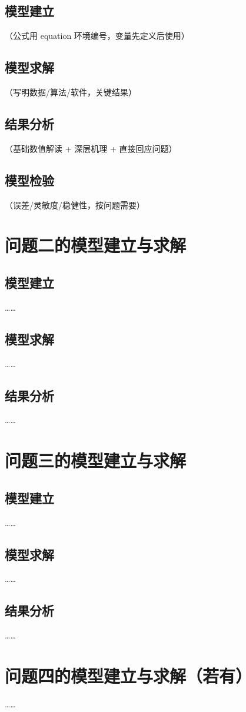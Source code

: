 \documentclass{cumcmthesis}
\begin{document}
\subsection{模型建立}
（公式用 equation 环境编号，变量先定义后使用）
\subsection{模型求解}
（写明数据/算法/软件，关键结果）
\subsection{结果分析}
（基础数值解读 + 深层机理 + 直接回应问题）
\subsection{模型检验}
（误差/灵敏度/稳健性，按问题需要）

\section{问题二的模型建立与求解}
\subsection{模型建立}
……
\subsection{模型求解}
……
\subsection{结果分析}
……

\section{问题三的模型建立与求解}
\subsection{模型建立}
……
\subsection{模型求解}
……
\subsection{结果分析}
……

\section{问题四的模型建立与求解（若有）}
……
\end{document}

